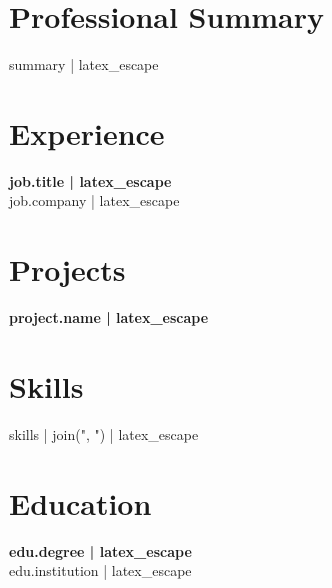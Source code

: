 \documentclass[11pt]{article}
\begin{document}
{%
\section*{Professional Summary}
{{ summary | latex_escape }}
{%

{%
\section*{Experience}
{%
\textbf{{ job.title | latex_escape }}\\
{{ job.company | latex_escape }}
{%
{%

\vspace{4pt}
{%
{%

{%
\section*{Projects}
{%
\textbf{{ project.name | latex_escape }}\\
{%

\vspace{4pt}
{%
{%

{%
\section*{Skills}
{{ skills | join(", ") | latex_escape }}
{%

{%
\section*{Education}
{%
\textbf{{ edu.degree | latex_escape }}\\
{{ edu.institution | latex_escape }}
{%

}}}}}}}}}}}}}}}}}}
\end{document}
